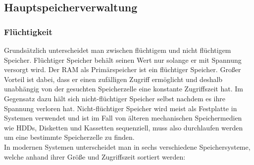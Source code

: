 \documentclass{article}
\begin{document}
	 \subsection{Hauptspeicherverwaltung}
	 \subsubsection{Flüchtigkeit}
	 Grundsätzlich unterscheidet man zwischen flüchtigem und nicht flüchtigem Speicher. Flüchtiger Speicher behält seinen Wert nur solange er mit Spannung versorgt wird. Der RAM als Primärspeicher ist ein flüchtiger Speicher. Großer Vorteil ist dabei, dass er einen zufälligen Zugriff ermöglicht und deshalb unabhängig von der gesuchten Speicherzelle eine konstante Zugriffszeit hat. Im Gegensatz dazu hält sich nicht-flüchtiger Speicher selbst nachdem es ihre Spannung verloren hat. Nicht-flüchtiger Speicher wird meist als Festplatte in Systemen verwendet und ist im Fall von älteren mechanischen Speichermedien wie HDDs, Disketten und Kassetten sequenziell, muss also durchlaufen werden um eine bestimmte Speicherzelle zu finden. \\
	 In modernen Systemen unterscheidet man in sechs verschiedene Speichersysteme, welche anhand ihrer Größe und Zugriffszeit sortiert werden:
\end{document}
